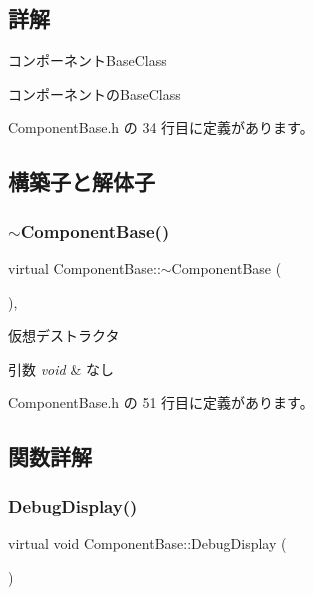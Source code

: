 \subsection{詳解}
コンポーネント\+Base\+Class 

コンポーネントの\+Base\+Class 

 Component\+Base.\+h の 34 行目に定義があります。



\subsection{構築子と解体子}
\mbox{\label{class_component_base_a5d22c6d5f792ff42ab6cb11a8ac38478}} 
\subsubsection{\texorpdfstring{$\sim$\+Component\+Base()}{~ComponentBase()}}
{\footnotesize\ttfamily virtual Component\+Base\+::$\sim$\+Component\+Base (\begin{DoxyParamCaption}{ }\end{DoxyParamCaption})\hspace{0.3cm}{\ttfamily [inline]}, {\ttfamily [virtual]}}



仮想デストラクタ 


\begin{DoxyParams}{引数}
{\em void} & なし \\
\hline
\end{DoxyParams}


 Component\+Base.\+h の 51 行目に定義があります。



\subsection{関数詳解}
\mbox{\label{class_component_base_a36ae7d27ad9d756fa245bad443020407}} 
\subsubsection{\texorpdfstring{Debug\+Display()}{DebugDisplay()}}
{\footnotesize\ttfamily virtual void Component\+Base\+::\+Debug\+Display (\begin{DoxyParamCaption}{ }\end{DoxyParamCaption})\hspace{0.3cm}{\ttfamily [pure virtual]}}



